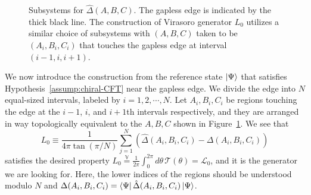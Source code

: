 \documentclass[12pt, nofootinbib]{article}
\theoremstyle{plain}
\theoremstyle{assumption}
\theoremstyle{definition}
\theoremstyle{plain}
\theoremstyle{plain}
\theoremstyle{plain}
\theoremstyle{plain}
\theoremstyle{plain}
\def\veq{\stackrel{\mathbb{V}}{=}}
\def\Lcft{\mathscr{L}}
\def\Tcft{\mathscr{T}}
\begin{document}
\begin{figure}[h]
    \centering
    \caption{Subsystems for $\hat{\Delta}(A,B,C)$. The gapless edge is indicated by the thick black line. The construction of Virasoro generator $L_0$ utilizes a similar choice of subsystems with $(A,B,C)$ taken to be $(A_i,B_i,C_i)$ that touches the gapless edge at interval $(i-1,i,i+1)$.} 
    \label{fig:L0_construction}
\end{figure}

We now introduce the construction from the reference state $\left|\Psi\right\rangle$ that satisfies Hypothesis~\ref{assump:chiral-CFT} near the gapless edge. 
We divide the edge into $N$ equal-sized intervals, labeled by $i=1,2,\cdots, N$. Let $A_i, B_i, C_i$ be regions touching the edge at the $i-1$, $i$, and $i+1$th intervals respectively, and they are arranged in way topologically equivalent to the $A,B,C$ shown in Figure~\ref{fig:L0_construction}. 
We see that 
\begin{equation}
\label{eq:L0}
    L_0 \equiv \frac{1}{4\pi \tan(\pi/N)}\sum_{j=1}^{N} \left( \hat{\Delta}(A_i, B_i, C_i) - \Delta(A_i, B_i, C_i) \right)
\end{equation}
satisfies the desired property $L_0 \veq  \frac{1}{2\pi}\int_0^{2\pi} d\theta \, \Tcft(\theta) =\Lcft_0$, and it is the generator we are looking for. 
Here, the lower indices of the regions should be understood modulo $N$ and $\Delta(A_i, B_i, C_i) = \left\langle\Psi\right| \hat{\Delta}(A_i, B_i, C_i) \left|\Psi\right\rangle$. 
\end{document}

